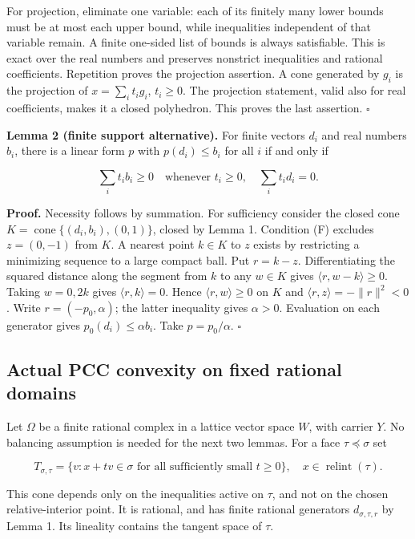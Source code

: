 \documentclass[
  10pt,
]{article}
\begin{document}
For projection, eliminate one variable: each of its finitely many lower
bounds must be at most each upper bound, while inequalities independent
of that variable remain. A finite one-sided list of bounds is always
satisfiable. This is exact over the real numbers and preserves nonstrict
inequalities and rational coefficients. Repetition proves the projection
assertion. A cone generated by \(g_i\) is the projection of
\(x=\sum_i t_i g_i\), \(t_i\geq0\). The projection statement, valid also
for real coefficients, makes it a closed polyhedron. This proves the
last assertion. \(\square\)

\textbf{Lemma 2 (finite support alternative).} For finite vectors
\(d_i\) and real numbers \(b_i\), there is a linear form \(p\) with
\(p(d_i)\leq b_i\) for all \(i\) if and only if

\[
\sum_i t_i b_i\geq0\quad\text{whenever }t_i\geq0,
\quad \sum_i t_i d_i=0. \tag{F}
\]

\textbf{Proof.} Necessity follows by summation. For sufficiency consider
the closed cone \(K=\operatorname{cone}\{(d_i,b_i),(0,1)\}\), closed by
Lemma 1. Condition (F) excludes \(z=(0,-1)\) from \(K\). A nearest point
\(k\in K\) to \(z\) exists by restricting a minimizing sequence to a
large compact ball. Put \(r=k-z\). Differentiating the squared distance
along the segment from \(k\) to any \(w\in K\) gives
\(\langle r,w-k\rangle\geq0\). Taking \(w=0,2k\) gives
\(\langle r,k\rangle=0\). Hence \(\langle r,w\rangle\geq0\) on \(K\) and
\(\langle r,z\rangle=-\|r\|^2<0\). Write \(r=(-p_0,\alpha)\); the latter
inequality gives \(\alpha>0\). Evaluation on each generator gives
\(p_0(d_i)\leq\alpha b_i\). Take \(p=p_0/\alpha\). \(\square\)

\subsection{Actual PCC convexity on fixed rational
domains}\label{actual-pcc-convexity-on-fixed-rational-domains}

Let \(\Omega\) be a finite rational complex in a lattice vector space
\(W\), with carrier \(Y\). No balancing assumption is needed for the
next two lemmas. For a face \(\tau\preceq\sigma\) set

\[
T_{\sigma,\tau}=\{v:x+tv\in\sigma\text{ for all sufficiently small }t\geq0\},
\quad x\in\operatorname{relint}(\tau).
\]

This cone depends only on the inequalities active on \(\tau\), and not
on the chosen relative-interior point. It is rational, and has finite
rational generators \(d_{\sigma,\tau,r}\) by Lemma 1. Its lineality
contains the tangent space of \(\tau\).
\end{document}
